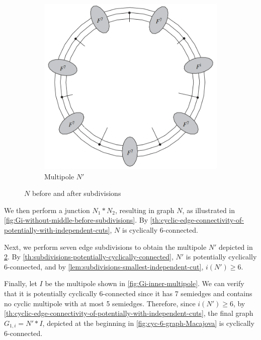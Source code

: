 \documentclass[12pt, twoside]{book}
\begin{document}
\begin{example}
\begin{figure}
\begin{subfigure}[b]{0.45\textwidth}
			\includegraphics[width=\textwidth]{images/multipole-to-Gi-without-middle}
			\caption{Multipole $N'$}
			\label{fig:Gi-without-middle-after-subdivisions}
		\end{subfigure}
		\caption{$N$ before and after subdivisions}
	\end{figure}

	We then perform a junction $N_1*N_2$, resulting in graph $N$, as illustrated in \cref{fig:Gi-without-middle-before-subdivisions}. By \cref{th:cyclic-edge-connectivity-of-potentially-with-independent-cuts}, $N$ is cyclically 6-connected.
	
	Next, we perform seven edge subdivisions to obtain the multipole $N'$ depicted in \cref{fig:Gi-without-middle-after-subdivisions}. By \cref{th:subdivisions-potentially-cyclically-connected}, $N'$ is potentially cyclically 6-connected, and by \cref{lem:subdivisions-smallest-independent-cut}, $i(N')\geq 6$.
	
	Finally, let $I$ be the multipole shown in \cref{fig:Gi-inner-multipole}. We can verify that it is potentially cyclically 6-connected since it has 7 semiedges and contains no cyclic multipole with at most 5 semiedges. Therefore, since $i(N')\geq 6$, by \cref{th:cyclic-edge-connectivity-of-potentially-with-independent-cuts}, the final graph $G_{1,i}=N'*I$, depicted at the beginning in \cref{fig:cyc-6-graph-Macajova} is cyclically 6-connected.
\end{example}
\end{document}
